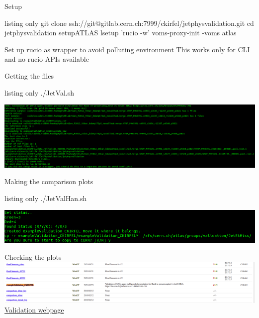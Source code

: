 %
\begin{frame}[containsverbatim]{Setup}
        \begin{tcblisting}{listing only}
git clone ssh://git@gitlab.cern.ch:7999/ckirfel/jetphysvalidation.git
cd jetphysvalidation            
setupATLAS
lsetup 'rucio -w'
voms-proxy-init -voms atlas
        \end{tcblisting}
    Set up rucio as wrapper to avoid polluting environment
    This works only for CLI and no rucio APIs available
\end{frame}
%
\begin{frame}[containsverbatim]{Getting the files}
    \begin{tcblisting}{listing only}
        ./JetVal.sh
    \end{tcblisting}
    \centering \includegraphics[width=\textwidth]{JetVal.png}    
\end{frame}
%
\begin{frame}[containsverbatim]{Making the comparison plots}
    \begin{tcblisting}{listing only}
        ./JetValHan.sh
    \end{tcblisting}
    \centering \includegraphics[width=\textwidth]{JetValHan.png}
\end{frame}
%
\begin{frame}{Checking the plots}
    \centering \includegraphics[width=\textwidth]{webpage.png}
    \href{https://atlas-computing.web.cern.ch/atlas-computing/links/PhysValDir/JetEtMiss/}{Validation webpage}
\end{frame}
%
